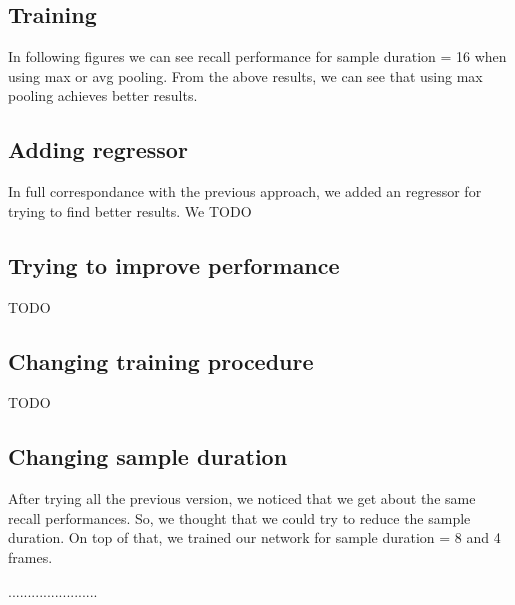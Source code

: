 \documentclass{report}
\begin{document}
\subsection{Training}
In following figures we can see recall performance for sample duration = 16 when using max or avg pooling. 
From the above results, we can see that using max pooling achieves better results.

\subsection{Adding regressor}
In full correspondance with the previous approach, we added an regressor for trying to find better results. We 
TODO
\subsection{Trying to  improve performance}
TODO
\subsection{Changing training procedure}
TODO
\subsection{Changing sample duration}
After trying all the previous version, we noticed that we get about the same recall performances. So, we thought that we could try
to reduce the sample duration. On top of that, we trained our network for sample duration = 8 and 4 frames.

.......................
\end{document}
